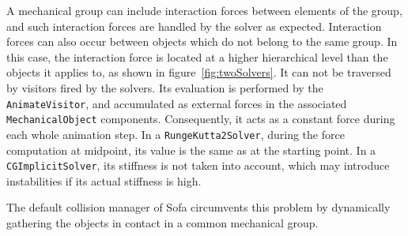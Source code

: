 A mechanical group can include interaction forces between elements of the group, and such interaction forces are handled by the solver as expected.
Interaction forces can also occur between objects which do not belong to the same group.
In this case, the interaction force is located at a higher hierarchical level than the objects it applies to, as shown in figure~\ref{fig:twoSolvers}.
It can not be traversed by visitors fired by the solvers.
Its evaluation is performed by the \texttt{AnimateVisitor}, and accumulated as external forces in the associated \texttt{MechanicalObject} components.
Consequently, it acts as a constant force during each whole animation step.
In a \texttt{RungeKutta2Solver}, during the force computation at midpoint, its value is the same as at the starting point.
In a \texttt{CGImplicitSolver}, its stiffness is not taken into account, which may introduce instabilities if its actual stiffness is high.

The default collision manager of Sofa circumvents this problem by dynamically gathering the objects in contact in a common mechanical group.

%
%
%

